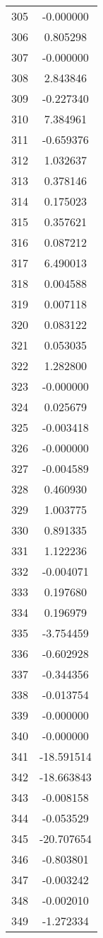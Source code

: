 \documentclass[12pt]{article}
\begin{document}
\begin{longtable}{@{}cc@{}}
305 & -0.000000 \\
306 & 0.805298 \\
307 & -0.000000 \\
308 & 2.843846 \\
309 & -0.227340 \\
310 & 7.384961 \\
311 & -0.659376 \\
312 & 1.032637 \\
313 & 0.378146 \\
314 & 0.175023 \\
315 & 0.357621 \\
316 & 0.087212 \\
317 & 6.490013 \\
318 & 0.004588 \\
319 & 0.007118 \\
320 & 0.083122 \\
321 & 0.053035 \\
322 & 1.282800 \\
323 & -0.000000 \\
324 & 0.025679 \\
325 & -0.003418 \\
326 & -0.000000 \\
327 & -0.004589 \\
328 & 0.460930 \\
329 & 1.003775 \\
330 & 0.891335 \\
331 & 1.122236 \\
332 & -0.004071 \\
333 & 0.197680 \\
334 & 0.196979 \\
335 & -3.754459 \\
336 & -0.602928 \\
337 & -0.344356 \\
338 & -0.013754 \\
339 & -0.000000 \\
340 & -0.000000 \\
341 & -18.591514 \\
342 & -18.663843 \\
343 & -0.008158 \\
344 & -0.053529 \\
345 & -20.707654 \\
346 & -0.803801 \\
347 & -0.003242 \\
348 & -0.002010 \\
349 & -1.272334 \\

\end{longtable}
\end{document}
